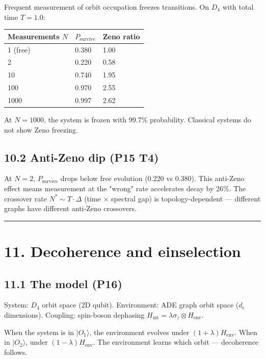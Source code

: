 \documentclass[11pt,a4paper]{article}
\begin{document}
Frequent measurement of orbit occupation freezes transitions. On $D_4$ with total time $T = 1.0$:

\begin{longtable}[]{@{}lll@{}}
\toprule
Measurements $N$ & $P_{\text{survive}}$ & Zeno ratio \\
\midrule\endhead
1 (free) & 0.380 & 1.00 \\
2 & 0.220 & 0.58 \\
10 & 0.740 & 1.95 \\
100 & 0.970 & 2.55 \\
1000 & 0.997 & 2.62 \\
\bottomrule
\end{longtable}

At $N = 1000$, the system is frozen with 99.7\% probability. Classical systems do not show Zeno freezing.

\subsection*{10.2 Anti-Zeno dip (P15 T4)}

At $N = 2$, $P_{\text{survive}}$ drops below free evolution (0.220 vs 0.380). This anti-Zeno effect means measurement at the "wrong" rate accelerates decay by 26\%. The crossover rate $N^* \sim T \cdot \Delta$ (time $\times$ spectral gap) is topology-dependent — different graphs have different anti-Zeno crossovers.

\begin{center}\rule{0.5\linewidth}{0.4pt}\end{center}

\section*{11. Decoherence and einselection}

\subsection*{11.1 The model (P16)}

System: $D_4$ orbit space (2D qubit). Environment: ADE graph orbit space ($d_e$ dimensions). Coupling: spin-boson dephasing $H_{\text{int}} = \lambda \sigma_z \otimes H_{\text{env}}$.

When the system is in $|O_1\rangle$, the environment evolves under $(1+\lambda)H_{\text{env}}$. When in $|O_2\rangle$, under $(1-\lambda)H_{\text{env}}$. The environment learns which orbit — decoherence follows.
\end{document}
